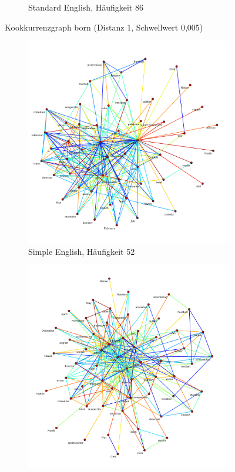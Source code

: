 \documentclass[11pt, a4paper]{article}
\begin{document}
\begin{figure}[hp!]
\begin{subfigure}[b]{0.5\textwidth}
        \caption{Standard English, Häufigkeit 86}
    \end{subfigure}
    \caption{Kookkurrenzgraph born (Distanz 1, Schwellwert 0,005)}
    \label{fig:hw-born}
\end{figure}

\begin{figure}[hp!]
    \centering
    \begin{subfigure}[b]{0.5\textwidth}
        \includegraphics[scale=.25]{../../data/results/cooc_wiki_sim/topwords-t0005/graph_American.pdf}
        \caption{Simple English, Häufigkeit 52}
    \end{subfigure}
    \begin{subfigure}[b]{0.5\textwidth}
        \includegraphics[scale=.25]{../../data/results/cooc_wiki_en/topwords-t0005/graph_American.pdf}

\end{subfigure}
\end{figure}
\end{document}
